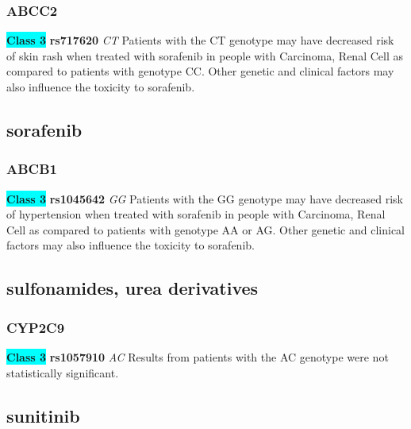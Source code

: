 \documentclass{book}
\begin{document}
\subsubsection{ ABCC2 }

\begin{center}
\textbf{\colorbox{cyan} {Class 3}} \textbf{ rs717620 } \textit{ CT }
Patients with the CT genotype may have decreased risk of skin rash when treated with sorafenib in people with Carcinoma, Renal Cell as compared to patients with genotype CC. Other genetic and clinical factors may also influence the toxicity to sorafenib.


\end{center}\subsection{ sorafenib }


\subsubsection{ ABCB1 }

\begin{center}
\textbf{\colorbox{cyan} {Class 3}} \textbf{ rs1045642 } \textit{ GG }
Patients with the GG genotype may have decreased risk of hypertension when treated with sorafenib in people with Carcinoma, Renal Cell as compared to patients with genotype AA or AG. Other genetic and clinical factors may also influence the toxicity to sorafenib.


\end{center}\subsection{ sulfonamides, urea derivatives }


\subsubsection{ CYP2C9 }

\begin{center}
\textbf{\colorbox{cyan} {Class 3}} \textbf{ rs1057910 } \textit{ AC }
Results from patients with the AC genotype were not statistically significant.


\end{center}\subsection{ sunitinib }
\end{document}
